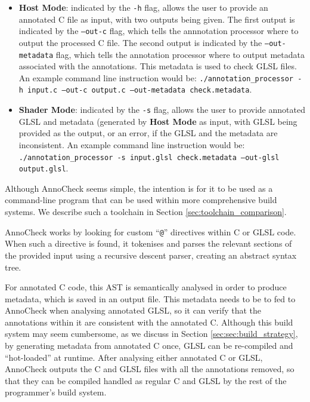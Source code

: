 \documentclass[a4paper,12pt,twoside,openright]{report}
\begin{document}
\begin{itemize}

    \item \textbf{Host Mode}: indicated by the \texttt{-h} flag, allows the
    user to provide an annotated C file as input, with two outputs being given.
    The first output is indicated by the \texttt{--out-c} flag, which tells the
    annnotation processor where to output the processed C file. The second
    output is indicated by the \texttt{--out-metadata} flag, which tells the
    annotation processor where to output metadata associated with the
    annotations. This metadata is used to check GLSL files. An example command
    line instruction would be: \texttt{./annotation\_processor -h input.c
    --out-c output.c --out-metadata check.metadata}.

    \item \textbf{Shader Mode}: indicated by the \texttt{-s} flag, allows the
    user to provide annotated GLSL and metadata (generated by \textbf{Host
    Mode} as input, with GLSL being provided as the output, or an error, if the
    GLSL and the metadata are inconsistent. An example command line instruction
    would be: \texttt{./annotation\_processor -s input.glsl check.metadata
    --out-glsl output.glsl}.

\end{itemize}

Although AnnoCheck seems simple, the intention is for it to be used as a
command-line program that can be used within more comprehensive build systems.
We describe such a toolchain in Section \ref{sec:toolchain_comparison}.

AnnoCheck works by looking for custom ``\texttt{@}'' directives within C or
GLSL code. When such a directive is found, it tokenises and parses the relevant
sections of the provided input using a recursive descent parser, creating an
abstract syntax tree.

For annotated C code, this AST is semantically analysed in order to produce
metadata, which is saved in an output file. This metadata needs to be to fed to
AnnoCheck when analysing annotated GLSL, so it can verify that the annotations
within it are consistent with the annotated C. Although this build system may
seem cumbersome, as we discuss in Section \ref{sec:sec:build_strategy}, by
generating metadata from annotated C once, GLSL can be re-compiled and
``hot-loaded'' at runtime. After analysing either annotated C or GLSL,
AnnoCheck outputs the C and GLSL files with all the annotations removed, so
that they can be compiled handled as regular C and GLSL by the rest of the
programmer's build system.
\end{document}
